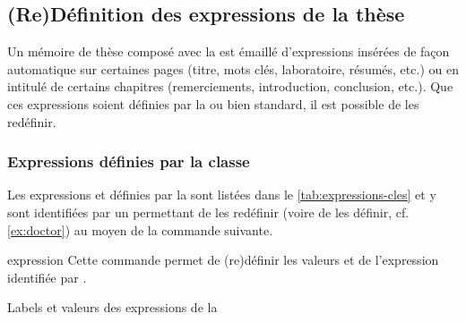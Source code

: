 \subsection{(Re)Définition des expressions de la thèse}\label{sec:expressions-cles}

Un mémoire de thèse composé avec la \yatcl est émaillé d'expressions insérées
de façon automatique sur certaines pages (titre, mots clés, laboratoire,
résumés, etc.) ou en intitulé de certains chapitres (remerciements,
introduction, conclusion, etc.). Que ces expressions soient définies par la
\yatcl ou bien standard, il est possible de les redéfinir.

\subsubsection{Expressions définies par la classe}
\label{sec:expr-defin-par}

Les expressions  et  définies par la \yatcl
sont listées dans le \vref{tab:expressions-cles} et y sont identifiées par un
 permettant de les redéfinir (voire de les définir, cf.
\vref{ex:doctor}) au moyen de la commande  suivante.
%
\begin{docCommand}{expression}{}
  Cette commande permet de (re)définir les valeurs  et
   de l'expression identifiée par .
\end{docCommand}

\begin{table}
  \centering
  
  \caption{Labels et valeurs des expressions de la \yatcl}
  \label{tab:expressions-cles}
\end{table}

